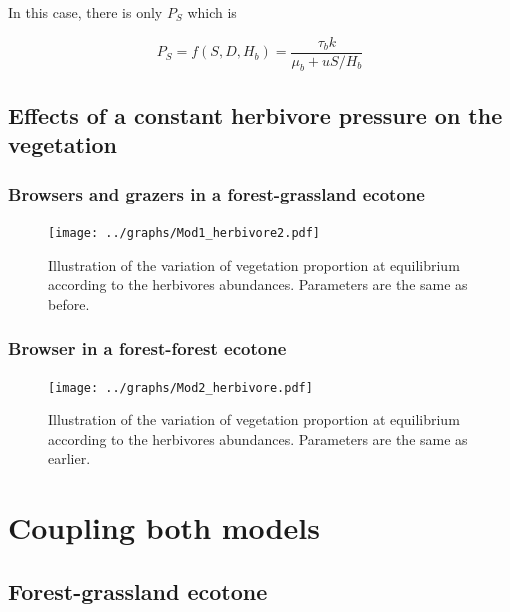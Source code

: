In this case, there is only $P_S$ which is

\[
P_S = f(S, D, H_b) =\frac{\tau_b k}{\mu_b+uS/H_b}
\]





\newpage
\subsection*{Effects of a constant herbivore pressure on the vegetation}

\subsubsection*{Browsers and grazers in a forest-grassland ecotone}

\begin{figure}[!h]
\texttt{[image: ../graphs/Mod1\_herbivore2.pdf]}
\caption{Illustration of the variation of vegetation proportion at equilibrium according to the herbivores abundances. Parameters are the same as before.}
\end{figure}

\newpage
\subsubsection*{Browser in a forest-forest ecotone}

\begin{figure}[!h]
\texttt{[image: ../graphs/Mod2\_herbivore.pdf]}
\caption{Illustration of the variation of vegetation proportion at equilibrium according to the herbivores abundances. Parameters are the same as earlier.}
\end{figure}




\newpage
\section{Coupling both models}
\subsection*{Forest-grassland ecotone}

